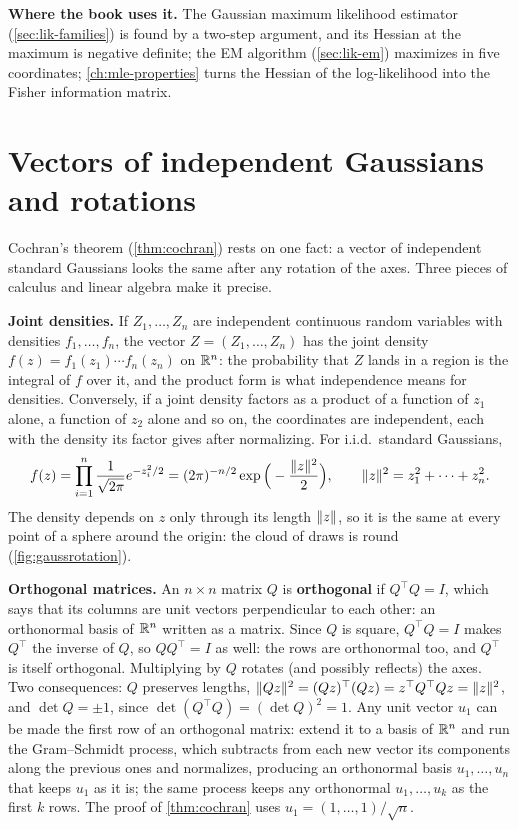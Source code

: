 \textbf{Where the book uses it.} The Gaussian maximum likelihood estimator (\cref{sec:lik-families}) is found by a two-step argument, and its Hessian at the maximum is negative definite; the EM algorithm (\cref{sec:lik-em}) maximizes in five coordinates; \cref{ch:mle-properties} turns the Hessian of the log-likelihood into the Fisher information matrix.

\section{Vectors of independent Gaussians and rotations}
\label{sec:math-gaussvec}

Cochran's theorem (\cref{thm:cochran}) rests on one fact: a vector of independent standard Gaussians looks the same after any rotation of the axes.
Three pieces of calculus and linear algebra make it precise.

\textbf{Joint densities.}
If $Z_1, \ldots, Z_n$ are independent continuous random variables with densities $f_1, \ldots, f_n$, the vector $Z = (Z_1, \ldots, Z_n)$ has the joint density $f(z) = f_1(z_1)\cdots f_n(z_n)$ on $\mathbb{R}^n$: the probability that $Z$ lands in a region is the integral of $f$ over it, and the product form is what independence means for densities.
Conversely, if a joint density factors as a product of a function of $z_1$ alone, a function of $z_2$ alone and so on, the coordinates are independent, each with the density its factor gives after normalizing.
For i.i.d.\ standard Gaussians,
\[
f(z) = \prod_{i=1}^n \frac{1}{\sqrt{2\pi}}e^{-z_i^2/2} = (2\pi)^{-n/2}\exp\Big(-\frac{\lVert z\rVert^2}{2}\Big), \qquad \lVert z\rVert^2 = z_1^2 + \cdots + z_n^2.
\]
The density depends on $z$ only through its length $\lVert z\rVert$, so it is the same at every point of a sphere around the origin: the cloud of draws is round (\cref{fig:gaussrotation}).

\textbf{Orthogonal matrices.}
An $n \times n$ matrix $Q$ is \textbf{orthogonal} if $Q^\top Q = I$, which says that its columns are unit vectors perpendicular to each other: an orthonormal basis of $\mathbb{R}^n$ written as a matrix. Since $Q$ is square, $Q^\top Q = I$ makes $Q^\top$ the inverse of $Q$, so $QQ^\top = I$ as well: the rows are orthonormal too, and $Q^\top$ is itself orthogonal.
Multiplying by $Q$ rotates (and possibly reflects) the axes.
Two consequences: $Q$ preserves lengths, $\lVert Qz\rVert^2 = (Qz)^\top(Qz) = z^\top Q^\top Q z = \lVert z\rVert^2$, and $\det Q = \pm 1$, since $\det(Q^\top Q) = (\det Q)^2 = 1$.
Any unit vector $u_1$ can be made the first row of an orthogonal matrix: extend it to a basis of $\mathbb{R}^n$ and run the Gram--Schmidt process, which subtracts from each new vector its components along the previous ones and normalizes, producing an orthonormal basis $u_1, \ldots, u_n$ that keeps $u_1$ as it is; the same process keeps any orthonormal $u_1, \ldots, u_k$ as the first $k$ rows.
The proof of \cref{thm:cochran} uses $u_1 = (1, \ldots, 1)/\sqrt{n}$.

